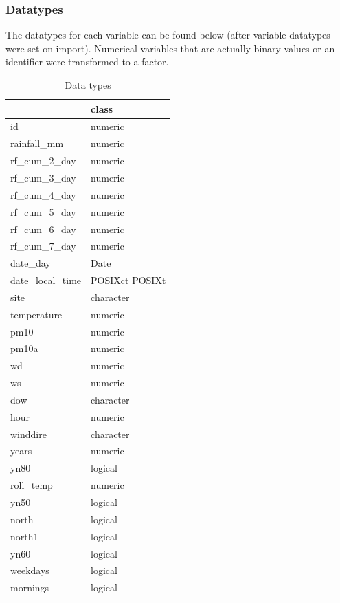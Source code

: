 \documentclass[12pt]{article}
\begin{document}
\hypertarget{datatypes}{%
\subsubsection{Datatypes}\label{datatypes}}

The datatypes for each variable can be found below (after variable
datatypes were set on import). Numerical variables that are actually
binary values or an identifier were transformed to a factor.

\begin{table}

\caption{\label{tab:unnamed-chunk-3}Data types}
\centering
\begin{tabu} to 
\hline
  & class\\
\hline
id & numeric\\
\hline
rainfall\_mm & numeric\\
\hline
rf\_cum\_2\_day & numeric\\
\hline
rf\_cum\_3\_day & numeric\\
\hline
rf\_cum\_4\_day & numeric\\
\hline
rf\_cum\_5\_day & numeric\\
\hline
rf\_cum\_6\_day & numeric\\
\hline
rf\_cum\_7\_day & numeric\\
\hline
date\_day & Date\\
\hline
date\_local\_time & POSIXct POSIXt\\
\hline
site & character\\
\hline
temperature & numeric\\
\hline
pm10 & numeric\\
\hline
pm10a & numeric\\
\hline
wd & numeric\\
\hline
ws & numeric\\
\hline
dow & character\\
\hline
hour & numeric\\
\hline
winddire & character\\
\hline
years & numeric\\
\hline
yn80 & logical\\
\hline
roll\_temp & numeric\\
\hline
yn50 & logical\\
\hline
north & logical\\
\hline
north1 & logical\\
\hline
yn60 & logical\\
\hline
weekdays & logical\\
\hline
mornings & logical\\
\hline
\end{tabu}
\end{table}
\end{document}
